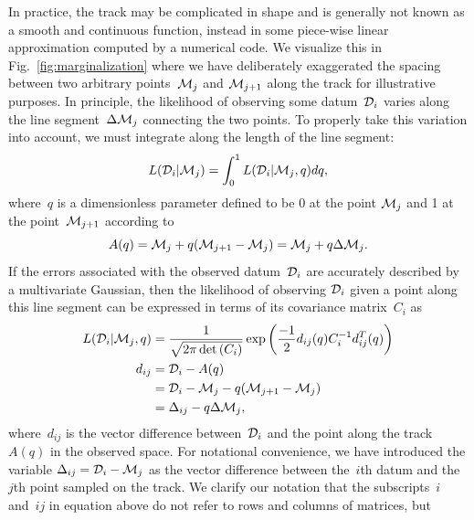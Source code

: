 \documentclass[ms.tex]{subfiles}
\begin{document}
In practice, the track may be complicated in shape and is generally not known
as a smooth and continuous function, instead in some piece-wise linear
approximation computed by a numerical code.
We visualize this in Fig.~\ref{fig:marginalization} where we have deliberately
exaggerated the spacing between two arbitrary points~$\mathcal{M}_j$ and
$\mathcal{M}_{j + 1}$ along the track for illustrative purposes.
In principle, the likelihood of observing some datum~$\mathcal{D}_i$ varies
along the line segment~$\Delta\mathcal{M}_j$ connecting the two points.
To properly take this variation into account, we must integrate along the
length of the line segment:
\begin{equation}
L(\mathcal{D}_i | \mathcal{M}_j) = \int_0^1 L(\mathcal{D}_i | \mathcal{M}_j, q) dq,
\label{eq:l_int_q}
\end{equation}
where~$q$ is a dimensionless parameter defined to be 0 at the point
$\mathcal{M}_j$ and 1 at the point~$\mathcal{M}_{j + 1}$ according to
\begin{equation}
A(q) = \mathcal{M}_j + q(\mathcal{M}_{j + 1} - \mathcal{M}_j)
= \mathcal{M}_j + q\Delta\mathcal{M}_j.
\end{equation}
If the errors associated with the observed datum~$\mathcal{D}_i$ are accurately
described by a multivariate Gaussian, then the likelihood of observing
$\mathcal{D}_i$ given a point along this line segment can be expressed in terms
of its covariance matrix~$C_i$ as
\begin{subequations}\begin{align}
L(\mathcal{D}_i | \mathcal{M}_j, q) &=
\frac{1}{\sqrt{2\pi \det{(C_i)}}}
\exp\left(\frac{-1}{2} d_{ij}(q) C_i^{-1} d_{ij}^T(q)\right)
\label{eq:l_di_mj_q}
\\
d_{ij} &= \mathcal{D}_i - A(q)
\\
&= \mathcal{D}_i - \mathcal{M}_j - q(\mathcal{M}_{j + 1} - \mathcal{M}_j)
\\
&= \Delta_{ij} - q\Delta \mathcal{M}_j,
\label{eq:delta_minus_qmj}
\end{align}\end{subequations}
where~$d_{ij}$ is the vector difference between~$\mathcal{D}_i$ and the
point along the track~$A(q)$ in the observed space.
For notational convenience, we have introduced the variable
$\Delta_{ij} = \mathcal{D}_i - \mathcal{M}_j$ as the vector difference between
the~$i$th datum and the~$j$th point sampled on the track.
We clarify our notation that the subscripts~$i$ and~$ij$ in equation
 above do not refer to rows and columns of matrices, but
\end{document}
